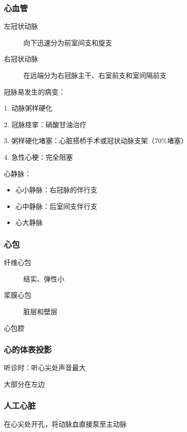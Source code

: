 \subsubsection*{心血管}%
\label{subsub:心血管}
\begin{description}
    \item [左冠状动脉] 向下迅速分为前室间支和旋支
    \item [右冠状动脉] 在远端分为右冠脉主干、右室前支和室间隔前支
\end{description}
\begin{notation}
冠脉易发生的病变：

1. 动脉粥样硬化

2. 冠脉痉挛：硝酸甘油治疗

3. 粥样硬化堵塞：心脏搭桥手术或冠状动脉支架（70\%堵塞）

4. 急性心梗：完全阻塞
\end{notation}
心静脉：
\begin{itemize}
    \item 心小静脉：右冠脉的伴行支
    \item 心中静脉：后室间支伴行支
    \item 心大静脉
\end{itemize}
\subsubsection*{心包}%
\label{subsub:心包}
\begin{description}
    \item[纤维心包] 结实、弹性小
    \item [浆膜心包] 脏层和壁层
    \item [心包腔]
\end{description}
\subsubsection*{心的体表投影}%
\label{subsub:心的体表投影}
\begin{notation}
听诊时：听心尖处声音最大
\end{notation}
大部分在左边
\subsubsection*{人工心脏}%
\label{subsub:人工心脏}
在心尖处开孔，将动脉血直接泵至主动脉
